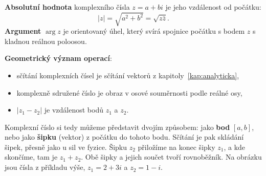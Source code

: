 \begin{definitionbox}
  \textbf{Absolutní hodnota} komplexního čísla $z = a + bi$ je jeho vzdálenost od počátku:
  \begin{equation*}
    |z| = \sqrt{a^2 + b^2} = \sqrt{z\bar{z}}.
  \end{equation*}
  \textbf{Argument} $\arg z$ je orientovaný úhel, který svírá spojnice počátku s bodem $z$ s kladnou reálnou poloosou.

  \vspace{0.2cm}

  \textbf{Geometrický význam operací}:
  \begin{itemize}
    \item sčítání komplexních čísel je sčítání vektorů z kapitoly~\ref{kap:analyticka},
    \item komplexně sdružené číslo je obraz v osové souměrnosti podle reálné osy,
    \item $|z_1 - z_2|$ je vzdálenost bodů $z_1$ a $z_2$.
  \end{itemize}
\end{definitionbox}

\begin{center}
\end{center}

Komplexní číslo si tedy můžeme představit dvojím způsobem: jako \textbf{bod} $[a, b]$, nebo jako \textbf{šipku} (vektor) z počátku do tohoto bodu. Sčítání je pak skládání šipek, přesně jako u sil ve fyzice. Šipku $z_2$ přiložíme na konec šipky $z_1$, a kde skončíme, tam je $z_1 + z_2$. Obě šipky a jejich součet tvoří rovnoběžník. Na obrázku jsou čísla z příkladu výše, $z_1 = 2 + 3i$ a $z_2 = 1 - i$.

